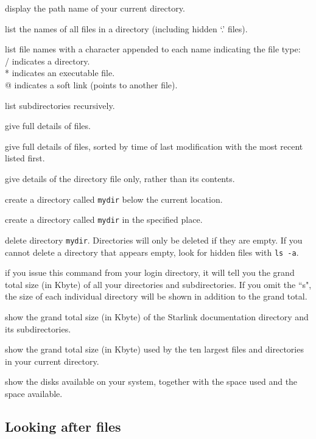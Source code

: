 \goodbreak

\exbegin

{display the path name of your current directory.}

{list the names of all files in a directory (including hidden `.' files).}

{list file names with a character appended to each name indicating
  the file type: \\
  /  indicates a directory.\\
  {*} indicates an executable file.\\
  @ indicates a soft link (points to another file).}

{list subdirectories recursively.}

{give full details of files.}

{give full details of files, sorted by time of last modification with the most
recent listed first.}

{give details of the directory file only, rather than its contents.}

{create a directory called {\tt mydir} below the current location.}

{create a directory called {\tt mydir} in the specified place.}

{delete directory {\tt mydir}. Directories will only be deleted if they are
empty.
If you cannot delete a directory that appears empty, look for hidden files
with {\tt ls -a}.}

{if you issue this command from your login directory, it will tell you the
grand total size (in Kbyte) of all your directories and subdirectories.
If you omit the ``s", the size of each individual directory will be shown
in addition to the grand total.}

{show the grand total size (in Kbyte) of the Starlink documentation directory
and its subdirectories.}

{show the grand total size (in Kbyte) used by the ten largest files
and directories in your current directory.}

{show the disks available on your system, together with the space used and the
space available.}

\exend

\subsection{Looking after files}

